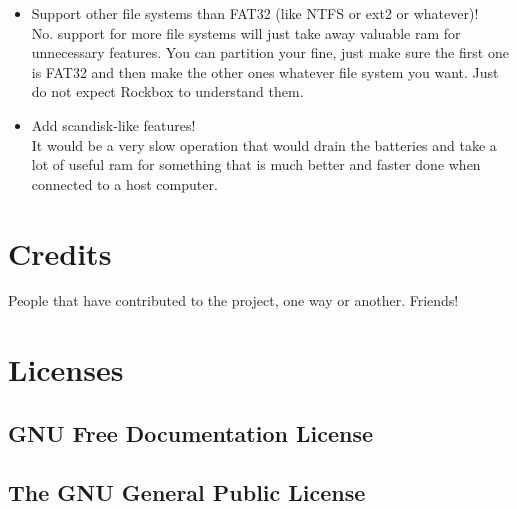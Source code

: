 \begin{itemize}
{  documentation.
}
\item Support other file systems than FAT32 (like NTFS or ext2 or whatever)!\\
  No.
  support for more file systems will just take away valuable ram for
  unnecessary features. You can partition your \dap{} fine, just make sure
  the first one is FAT32 and then make the other ones whatever file system
  you want. Just do not expect Rockbox to understand them.
\item Add scandisk{}-like features!\\
  It would be a very slow operation that would drain the batteries and
  take a lot of useful ram for something that is much better and faster
  done when connected to a host computer.
\end{itemize}



\chapter{Credits}
People that have contributed to the project, one way or another. Friends!
%
\begin{multicols}{2}
\noindent\caps{\small{}}
\end{multicols}

\chapter{Licenses}

\section{GNU Free Documentation License}

\newpage
\section{The GNU General Public License}

